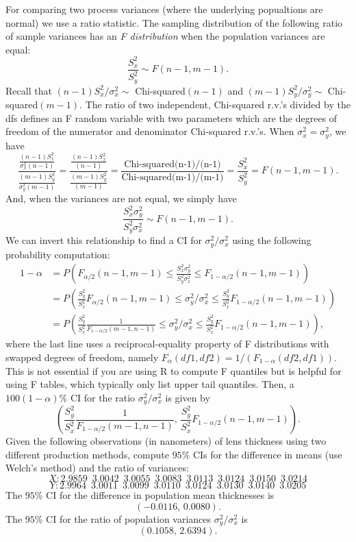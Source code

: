 \documentclass[
]{book}
\begin{document}
For comparing two process variances (where the underlying popualtions are normal) we use a ratio statistic. The sampling distribution of the following ratio of sample variances has an \emph{F distribution} when the population variances are equal:
\[\frac{S_x^2}{S_y^2} \sim F(n-1, m-1).\]
Recall that \((n-1)S_x^2/\sigma_x^2 \sim\) Chi-squared\((n-1)\) and \((m-1)S_y^2/\sigma_y^2 \sim\) Chi-squared\((m-1)\). The ratio of two independent, Chi-squared r.v.'s divided by the dfs defines an F random variable with two parameters which are the degrees of freedom of the numerator and denominator Chi-squared r.v.'s. When \(\sigma_x^2 = \sigma_y^2\), we have
\[\frac{\frac{(n-1)S_x^2}{\sigma_x^2(n-1)}}{\frac{(m-1)S_y^2}{\sigma_y^2(m-1)}} = \frac{\frac{(n-1)S_x^2}{(n-1)}}{\frac{(m-1)S_y^2}{(m-1)}} = \frac{\text{Chi-squared(n-1)/(n-1)}}{\text{Chi-squared(m-1)/(m-1)}} = \frac{S_x^2}{S_y^2} =  F(n-1, m-1).\]
And, when the variances are not equal, we simply have
\[\frac{S_x^2 \sigma_y^2}{S_y^2 \sigma_x^2} \sim F(n-1, m-1).\]
We can invert this relationship to find a CI for \(\sigma_y^2 / \sigma_x^2\) using the following probability computation:
\begin{align*}
1-\alpha & = P(F_{\alpha/2}(n-1, m-1) \leq \frac{S_x^2 \sigma_y^2}{S_y^2 \sigma_x^2} \leq F_{1-\alpha/2}(n-1, m-1))\\
& = P(\frac{S_y^2}{S_x^2}F_{\alpha/2}(n-1, m-1) \leq \sigma_y^2/\sigma_x^2 \leq \frac{S_y^2}{S_x^2}F_{1-\alpha/2}(n-1, m-1))\\
& = P(\frac{S_y^2}{S_x^2}\frac{1}{F_{1-\alpha/2}(m-1, n-1)} \leq \sigma_y^2/\sigma_x^2 \leq \frac{S_y^2}{S_x^2}F_{1-\alpha/2}(n-1, m-1)),
\end{align*}
where the last line uses a reciprocal-equality property of F distributions with swapped degrees of freedom, namely \(F_{\alpha}(df1, df2) = 1/(F_{1-\alpha}(df2, df1))\). This is not essential if you are using R to compute F quantiles but is helpful for using F tables, which typically only list upper tail quantiles. Then, a \(100(1-\alpha)\%\) CI for the ratio \(\sigma_y^2/\sigma_x^2\) is given by
\[\left(\frac{S_y^2}{S_x^2}\frac{1}{F_{1-\alpha/2}(m-1, n-1)}, \,\frac{S_y^2}{S_x^2}F_{1-\alpha/2}(n-1, m-1)\right).\]
Given the following observations (in nanometers) of lens thickness using two different production methods, compute \(95\%\) CIs for the difference in means (use Welch's method) and the ratio of variances:
\[X: 2.9859\,\,\, 3.0042\,\,\, 3.0055 \,\,\,3.0083 \,\,\,3.0113 \,\,\,3.0124\,\,\, 3.0150\,\,\, 3.0214\]
\[Y: 2.9964\,\,\, 3.0011 \,\,\,3.0099\,\,\, 3.0110\,\,\, 3.0124\,\,\, 3.0130\,\,\, 3.0140\,\,\, 3.0205\]
The \(95\%\) CI for the difference in population mean thicknesses is
\[(-0.0116, \, 0.0080).\]
The \(95\%\) CI for the ratio of population variances \(\sigma_y^2/\sigma_x^2\) is
\[(0.1058, \, 2.6394).\]
\end{document}
